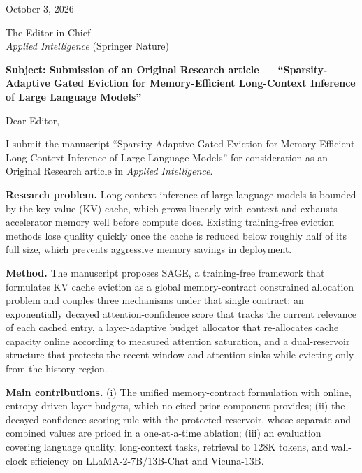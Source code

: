 \documentclass[11pt,a4paper]{article}
\newcommand{\papertitle}{Sparsity-Adaptive Gated Eviction for
Memory-Efficient Long-Context Inference of Large Language Models}
\begin{document}
\noindent October 3, 2026

\vspace{1.2em}

\noindent The Editor-in-Chief\\
\textit{Applied Intelligence} (Springer Nature)

\vspace{1.2em}

\noindent\textbf{Subject: Submission of an Original Research article ---
``\papertitle{}''}

\vspace{1.2em}

\noindent Dear Editor,

\vspace{0.8em}

I submit the manuscript ``\papertitle{}'' for consideration as an
Original Research article in \textit{Applied Intelligence}.

\vspace{0.6em}

\noindent\textbf{Research problem.} Long-context inference of large
language models is bounded by the key-value (KV) cache, which grows
linearly with context and exhausts accelerator memory well before
compute does. Existing training-free eviction methods lose quality
quickly once the cache is reduced below roughly half of its full size,
which prevents aggressive memory savings in deployment.

\vspace{0.6em}

\noindent\textbf{Method.} The manuscript proposes SAGE, a training-free
framework that formulates KV cache eviction as a global
memory-contract constrained allocation problem and couples three
mechanisms under that single contract: an exponentially decayed
attention-confidence score that tracks the current relevance of each
cached entry, a layer-adaptive budget allocator that re-allocates cache
capacity online according to measured attention saturation, and a
dual-reservoir structure that protects the recent window and attention
sinks while evicting only from the history region.

\vspace{0.6em}

\noindent\textbf{Main contributions.} (i) The unified
memory-contract formulation with online, entropy-driven layer budgets,
which no cited prior component provides; (ii) the decayed-confidence
scoring rule with the protected reservoir, whose separate and combined
values are priced in a one-at-a-time ablation; (iii) an evaluation
covering language quality, long-context tasks, retrieval to 128K
tokens, and wall-clock efficiency on LLaMA-2-7B/13B-Chat and
Vicuna-13B.
\end{document}
